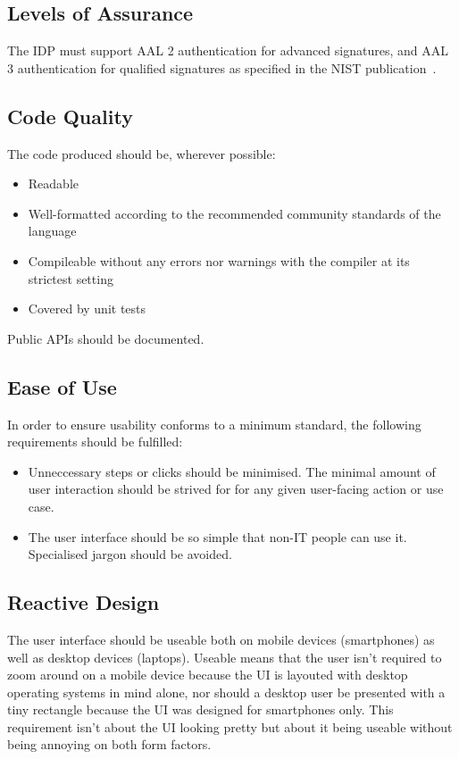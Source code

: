 \subsection{Levels of Assurance}\label{subsec:levels-of-assurance}
The \gls{IDP} must support \gls{AAL} 2 authentication for advanced signatures, and \gls{AAL} 3 authentication for qualified signatures as specified in the \gls{NIST} publication~\cite{nistdigitalidentityguidelines}.

\subsection{Code Quality}\label{subsec:code-quality}
The code produced should be, wherever possible:
\begin{itemize}
    \item Readable
    \item Well-formatted according to the recommended community standards of the language
    \item Compileable without any errors nor warnings with the compiler at its strictest setting
    \item Covered by unit tests
\end{itemize}
Public \gls{API}s should be documented.

\subsection{Ease of Use}\label{subsec:ease-of-use}
In order to ensure usability conforms to a minimum standard, the following requirements should be fulfilled:
\begin{itemize}
    \item Unneccessary steps or clicks should be minimised. The minimal amount of user interaction should be strived for for any given user-facing action or use case.
    \item The user interface should be so simple that non-IT people can use it. Specialised jargon should be avoided.
\end{itemize}

\subsection{Reactive Design}\label{subsec:reactive-design}
The user interface should be useable both on mobile devices (smartphones) as well as desktop devices (laptops).
Useable means that the user isn't required to zoom around on a mobile device because the \gls{UI} is layouted with desktop operating systems in mind alone,
nor should a desktop user be presented with a tiny rectangle because the \gls{UI} was designed for smartphones only.
This requirement isn't about the \gls{UI} looking pretty but about it being useable without being annoying on both form factors.

